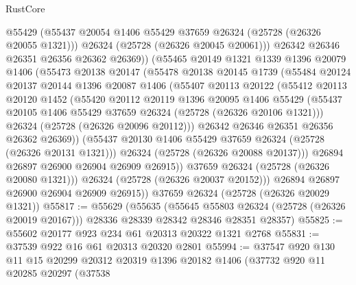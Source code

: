 \begin{lexlean}{RustCore}
\begin{coremodule}
                @55429
                (@55437 @20054 @1406 @55429 @37659 @26324 (@25728 (@26326 @20055 @1321)))
                @26324
                (@25728 (@26326 @20045 @20061)))
              @26342
              @26346
              @26351
              @26356
              @26362
              @26369))
          (@55465
            @20149
            @1321
            @1339
            @1396
            @20079
            @1406
            (@55473
              @20138
              @20147
              (@55478
                @20138
                @20145
                @1739
                (@55484
                  @20124
                  @20137
                  @20144
                  @1396
                  @20087
                  @1406
                  (@55407
                    @20113
                    @20122
                    (@55412
                      @20113
                      @20120
                      @1452
                      (@55420
                        @20112
                        @20119
                        @1396
                        @20095
                        @1406
                        @55429
                        (@55437 @20105 @1406 @55429 @37659 @26324 (@25728 (@26326 @20106 @1321)))
                        @26324
                        (@25728 (@26326 @20096 @20112)))
                      @26342
                      @26346
                      @26351
                      @26356
                      @26362
                      @26369))
                  (@55437 @20130 @1406 @55429 @37659 @26324 (@25728 (@26326 @20131 @1321)))
                  @26324
                  (@25728 (@26326 @20088 @20137)))
                @26894
                @26897
                @26900
                @26904
                @26909
                @26915))
            @37659
            @26324
            (@25728 (@26326 @20080 @1321)))
          @26324
          (@25728 (@26326 @20037 @20152)))
        @26894
        @26897
        @26900
        @26904
        @26909
        @26915))
    @37659
    @26324
    (@25728 (@26326 @20029 @1321))
@55817 := @55629
    (@55635
      (@55645 @55803 @26324 (@25728 (@26326 @20019 @20167)))
      @28336
      @28339
      @28342
      @28346
      @28351
      @28357)
@55825 := @55602 @20177 @923 @234 @61 @20313 @20322 @1321 @2768
@55831 := @37539 @922 @16 @61 @20313 @20320 @2801
@55994 := @37547
    @920
    @130
    @11
    @15
    @20299
    @20312
    @20319
    @1396
    @20182
    @1406
    (@37732
      @920
      @11
      @20285
      @20297
      (@37538

\end{coremodule}
\end{lexlean}
